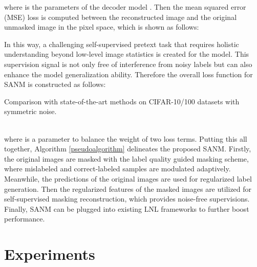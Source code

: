 \documentclass[10pt,twocolumn,letterpaper]{article}
\begin{document}
where  is the parameters of the decoder model . Then the mean squared error (MSE) loss is computed between the reconstructed image  and the original unmasked image  in the pixel space, which is shown as follows:

In this way, a challenging self-supervised pretext task that requires holistic understanding beyond low-level image statistics is created for the model. {This supervision signal is not only free of interference from noisy labels but can also enhance the model generalization ability.}
Therefore the overall loss function for SANM is constructed as follows:

\begin{table*}[!t]
\footnotesize
    \centering
    \caption{
        Comparison with state-of-the-art methods on CIFAR-10/100 datasets with symmetric noise.
}
    \vspace{-1em}
    \setlength\tabcolsep{10pt} \renewcommand{\arraystretch}{1.3}
    \resizebox{0.83\textwidth}{!}{+}
    \label{tab:cifar_sym}
    \vspace{-2mm}
\end{table*}
\\
where  is a parameter to balance the weight of two loss terms. Putting this all together, Algorithm \ref{pseudoalgorithm} delineates the proposed SANM. Firstly, the original images are masked with the label quality guided masking scheme, where mislabeled and correct-labeled samples are modulated adaptively. Meanwhile, the predictions of the original images are used for regularized label generation. Then the regularized features of the masked images are utilized for self-supervised masking reconstruction, which provides noise-free supervisions. Finally, SANM can be plugged into existing LNL frameworks to further boost performance.









\section{Experiments}
\vspace{-1em}
\end{document}
